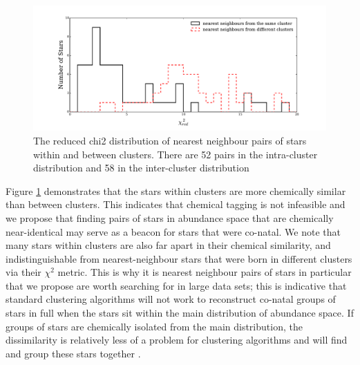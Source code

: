 \documentclass[14pt, preprint2]{aastex6}
\begin{document}
\begin{figure}%
\centering
\includegraphics[scale=0.4]{chi2red.pdf} 
  \caption{The reduced chi2 distribution of nearest neighbour pairs of stars within and between clusters. There are 52 pairs in the intra-cluster distribution and 58 in the inter-cluster distribution}
\label{fig:chi2}
\end{figure}


Figure \ref{fig:chi2} demonstrates that the stars within clusters are more chemically similar than between clusters. This indicates that chemical tagging is not infeasible and we propose that finding pairs of stars in abundance space that are chemically near-identical may serve as a beacon for stars that were co-natal.  We note that many stars within clusters are also far apart in their chemical similarity, and indistinguishable from nearest-neighbour stars that were born in different clusters via their $\chi^2$ metric. This is why it is nearest neighbour pairs of stars in particular that we propose are worth searching for in large data sets; this is indicative that standard clustering algorithms will not work to reconstruct co-natal groups of stars in full when the stars sit within the main distribution of abundance space. If groups of stars are chemically isolated from the main distribution, the dissimilarity is relatively less of a problem for clustering algorithms and will find and group these stars together \citep[see][for success of chemical tagging of targeted metal-poor globular clusters]{Hogg2016}.





\end{document}
